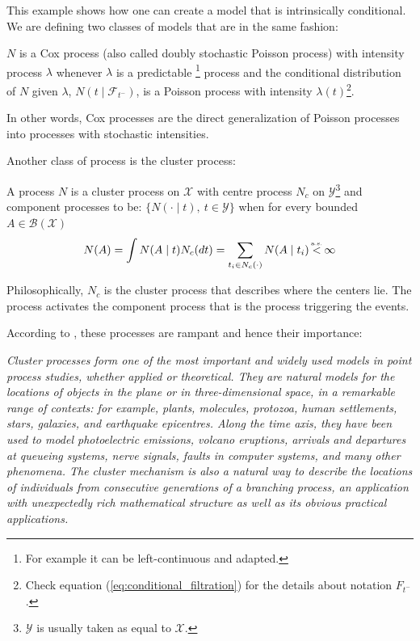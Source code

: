 \documentclass[11pt]{book}
\begin{document}
This example shows how one can create a model that is intrinsically conditional. We are defining two classes of models that are in the same fashion:


\begin{definition}
$N$ is a Cox process (also called doubly stochastic Poisson process) with intensity process $\lambda$ whenever $\lambda$ is a predictable \footnote{For example it can be left-continuous and adapted.} process and the conditional distribution of $N$ given $\lambda$, $N(t \mid \mathcal F_{t^-})$, is a Poisson process with intensity $\lambda (t) $\footnote{Check equation (\ref{eq:conditional_filtration}) for the details about notation $F_{t^-}$.}. 

In other words, Cox processes are the direct generalization of Poisson processes into processes with stochastic intensities.

\end{definition}

Another class of process is the cluster process:

\begin{definition}
\label{def:cluster_process}
A process $ N$ is a cluster process on $\mathcal X$ with centre process $ N_c $ on $\mathcal Y$\footnote{$\mathcal Y$ is usually taken as equal to $\mathcal X$.} and component processes to be: $\{N( \cdot \mid t ), \ t \in \mathcal Y \}$ when for every bounded $A \in \mathcal B( \mathcal X )$
\begin{equation}
N(A) = \int N(A \mid t  ) N_c (dt) = \sum_{ t_i \in N_c(\cdot) } N(A \mid t_i )  \stackrel{\mathclap{\mbox{\normalfont\tiny a.s.}}}{<} \infty 
\end{equation}

Philosophically, $N_c$ is the cluster process that describes where the centers lie. The process activates the component process that is the process triggering the events.


\end{definition}
According to \cite{daley}, these processes are rampant and hence their importance:

\textit{Cluster processes form one of the most important and widely used models in point process studies, whether applied or theoretical. They are natural models for the locations of objects in the plane or in three-dimensional space, in a remarkable range of contexts: for example, plants, molecules, protozoa, human settlements, stars, galaxies, and earthquake epicentres. Along the time axis, they have been used to model photoelectric emissions, volcano eruptions, arrivals and departures at queueing systems, nerve signals, faults in computer systems, and many other phenomena. The cluster mechanism is also a natural way to describe the locations of individuals from consecutive generations of a branching process, an application with unexpectedly rich mathematical structure as well as its obvious practical applications.}
\end{document}
